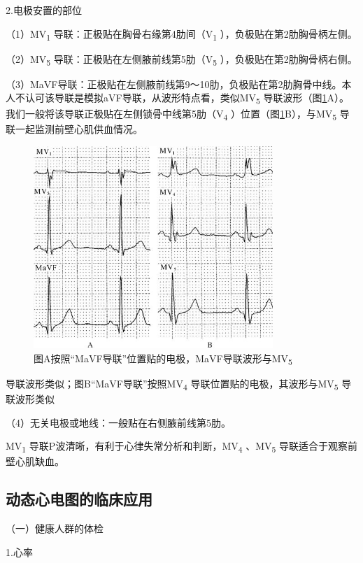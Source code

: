 2.电极安置的部位

（1）MV\textsubscript{1}
导联：正极贴在胸骨右缘第4肋间（V\textsubscript{1}
），负极贴在第2肋胸骨柄左侧。

（2）MV\textsubscript{5}
导联：正极贴在左侧腋前线第5肋（V\textsubscript{5}
），负极贴在第2肋胸骨柄右侧。

（3）MaVF导联：正极贴在左侧腋前线第9～10肋，负极贴在第2肋胸骨中线。本人不认可该导联是模拟aVF导联，从波形特点看，类似MV\textsubscript{5}
导联波形（图\ref{fig47-8}A）。我们一般将该导联正极贴在左侧锁骨中线第5肋（V\textsubscript{4}
）位置（图\ref{fig47-8}B），与MV\textsubscript{5} 导联一起监测前壁心肌供血情况。

\begin{figure}[!htbp]
 \centering
 \includegraphics[width=3.5625in,height=3.02083in]{./images/Image00745.jpg}
 \captionsetup{justification=centering}
 \caption{图A按照“MaVF导联”位置贴的电极，MaVF导联波形与MV\textsubscript{5}}
 \label{fig47-8}
  \end{figure} 
导联波形类似；图B“MaVF导联”按照MV\textsubscript{4}
导联位置贴的电极，其波形与MV\textsubscript{5} 导联波形类似

（4）无关电极或地线：一般贴在右侧腋前线第5肋。

MV\textsubscript{1}
导联P波清晰，有利于心律失常分析和判断，MV\textsubscript{4}
、MV\textsubscript{5} 导联适合于观察前壁心肌缺血。

\protect\hypertarget{text00056.htmlux5cux23subid674}{}{}

\subsection{动态心电图的临床应用}

（一）健康人群的体检

1.心率

